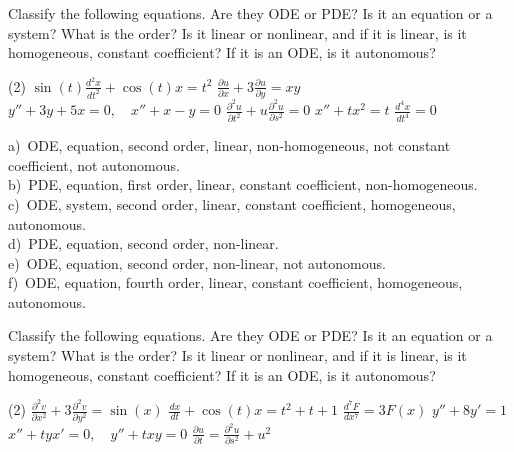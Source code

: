 \begin{exercise}
Classify the following equations.  Are they ODE or PDE\@?  Is it an equation
or a system?  What is the order?  Is it linear or nonlinear, and if it is
linear, is it homogeneous, constant coefficient?  If it is an ODE\@, is it
autonomous?
\begin{tasks}(2)
\task $\displaystyle \sin(t) \frac{d^2 x}{dt^2} + \cos(t) x = t^2$
\task $\displaystyle \frac{\partial u}{\partial x} + 3 \frac{\partial u}{\partial y} = xy$
\task $\displaystyle y''+3y+5x=0, \quad x''+x-y=0$
\task $\displaystyle \frac{\partial^2 u}{\partial t^2} + u\frac{\partial^2 u}{\partial s^2} =
0$
\task $\displaystyle x''+tx^2=t$
\task $\displaystyle \frac{d^4 x}{dt^4} = 0$
\end{tasks}
\end{exercise}
\comboSol{%
}
{%
a)~ODE, equation, second order, linear, non-homogeneous, not constant coefficient, not autonomous.\\
b)~PDE, equation, first order, linear, constant coefficient, non-homogeneous.\\
c)~ODE, system, second order, linear, constant coefficient, homogeneous, autonomous.\\
d)~PDE, equation, second order, non-linear.\\
e)~ODE, equation, second order, non-linear, not autonomous.\\
f)~ODE, equation, fourth order, linear, constant coefficient, homogeneous, autonomous.
}

\begin{exercise}\ansMark%
Classify the following equations.  Are they ODE or PDE\@?  Is it an equation
or a system?  What is the order?  Is it linear or nonlinear, and if it is
linear, is it homogeneous, constant coefficient?  If it is an ODE\@, is it
autonomous?
\begin{tasks}(2)
\task $\displaystyle \frac{\partial^2 v}{\partial x^2} + 3 \frac{\partial^2
v}{\partial y^2} = \sin(x)$
\task $\displaystyle \frac{d x}{dt} + \cos(t) x = t^2+t+1$
\task $\displaystyle \frac{d^7 F}{dx^7} = 3F(x)$
\task $\displaystyle y''+8y'=1$
\task $\displaystyle x''+tyx'=0, \quad y''+txy = 0$
\task $\displaystyle \frac{\partial u}{\partial t} = \frac{\partial^2 u}{\partial s^2} + u^2$
\end{tasks}
\end{exercise}

